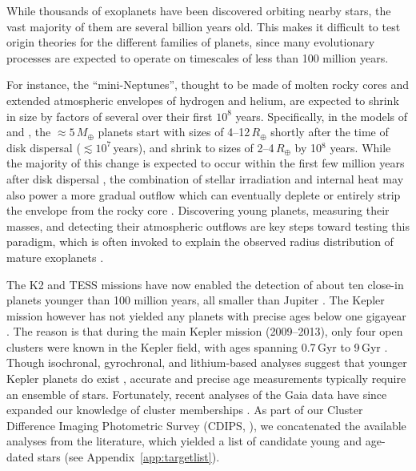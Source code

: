 \documentclass[12pt,modern,twocolumn,tighten]{aastex63}
\begin{document}
While thousands of exoplanets have been discovered orbiting nearby
stars, the vast majority of them are several billion years old.  This
makes it difficult to test origin theories for the different families
of planets, since many evolutionary processes are expected to operate
on timescales of less than 100 million years.

For instance, the ``mini-Neptunes'', thought to be made of molten
rocky cores \citep{kite_atmosphere_2020} and extended atmospheric
envelopes of hydrogen and helium, are expected to shrink in size by
factors of several over their first $10^8$ years.  Specifically, in
the models of \citet{owen_atmospheres_2016} and
\citet{owen_constraining_2020}, the $\approx5\,M_\oplus$ planets start
with sizes of 4--12\,$R_\oplus$ shortly after the time of disk
dispersal ($\lesssim$$10^7$\,years), and shrink to sizes of
2--4\,$R_\oplus$ by 10$^8$ years.  While the majority of this change
is expected to occur within the first few million years after disk
dispersal \citep{owen_atmospheres_2016}, the combination of stellar
irradiation and internal heat may also power a more gradual outflow
which can eventually deplete or entirely strip the envelope from the
rocky core \citep{Owen_Wu_2013,ginzburg_corepowered_2018}.
Discovering young planets, measuring their masses, and detecting their
atmospheric outflows are key steps toward testing this paradigm, which
is often invoked to explain the observed radius distribution of mature
exoplanets \citep{Fulton_et_al_2017}.

The K2 and TESS missions have now enabled the detection of about ten
close-in planets younger than 100 million years, all smaller than
Jupiter
\citep{Mann_K2_33b_2016,David_et_al_2017,david_four_2019,newton_tess_2019,bouma_cluster_2020,plavchan_planet_2020,rizzuto_tess_2020,martioli_aumicbc_2021}.
The Kepler mission however has not yielded any planets with precise
ages below one gigayear \citep{Meibom_et_al_2013}.  The reason is that
during the main Kepler mission (2009--2013), only four open clusters
were known in the Kepler field,
with ages spanning 0.7\,Gyr to 9\,Gyr
\citep{meibom_kepler_2011}.  Though isochronal, gyrochronal, and lithium-based
analyses suggest that younger Kepler planets do exist
\citep{berger_identifying_2018,david_sizes_2021}, accurate and precise
age measurements typically require an ensemble of stars.  Fortunately,
recent analyses of the Gaia
data have since expanded our knowledge of cluster memberships
\citep[{\it
e.g.},][]{cantatgaudin_gaia_2018,zari_3d_2018,kounkel_untangling_2019,Meingast2021,Kerr2021}.
As part of our Cluster Difference Imaging Photometric Survey (CDIPS,
\citealt{bouma_cdipsI_2019}), we concatenated the available analyses
from the literature, which yielded a list of candidate young and
age-dated stars (see Appendix~\ref{app:targetlist}).
\end{document}
